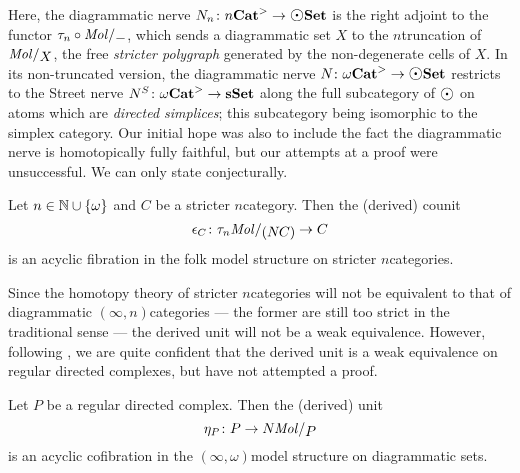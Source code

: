 \noindent Here, the diagrammatic nerve \( \N{n} \colon \snCat{n} \to \dgmSet \) is the right adjoint to the functor \( \trunc{n} \after \molecin{-} \), which sends a diagrammatic set \( X \) to the \( n \)\nbd truncation of \( \molecin{X} \), the free \emph{stricter polygraph} generated by the non-degenerate cells of \( X \).
In its non-truncated version, the diagrammatic nerve \( \N{} \colon \somegaCat \to \dgmSet \) restricts to the Street nerve \cite{street1987oriental} \( N^S \colon {\omega\mathbf{Cat}}^> \to \mathbf{sSet} \) along the full subcategory of \( \atom \) on atoms which are \emph{directed simplices}; this subcategory being isomorphic to the simplex category.
Our initial hope was also to include the fact the diagrammatic nerve is homotopically fully faithful, but our attempts at a proof were unsuccessful.
We can only state conjecturally.
\begin{conj*}
    Let \( n \in \mathbb{N} \cup \left\{ {\omega} \right\} \) and \( C \) be a stricter \( n \)\nbd category. 
    Then the (derived) counit
    \begin{equation*}
        \counit_C \colon \trunc{n} \molecin{(\N{}C)} \to C
    \end{equation*}
    is an acyclic fibration in the folk model structure on stricter \( n \)\nbd categories.
\end{conj*}

\noindent Since the homotopy theory of stricter \( n \)\nbd categories will not be equivalent to that of diagrammatic \( (\infty, n) \)\nbd categories --- the former are still too strict in the traditional sense --- the derived unit will not be a weak equivalence.
However, following \cite{gagna2023nerve, maehara2023oriental}, we are quite confident that the derived unit is a weak equivalence on regular directed complexes, but have not attempted a proof.
\begin{conj*}
    Let \( P \) be a regular directed complex.
    Then the (derived) unit 
    \begin{equation*}
        \unit_P \colon P \to \N{}\molecin{P}
    \end{equation*}
    is an acyclic cofibration in the \( (\infty, \omega) \)\nbd model structure on diagrammatic sets. 
\end{conj*}


